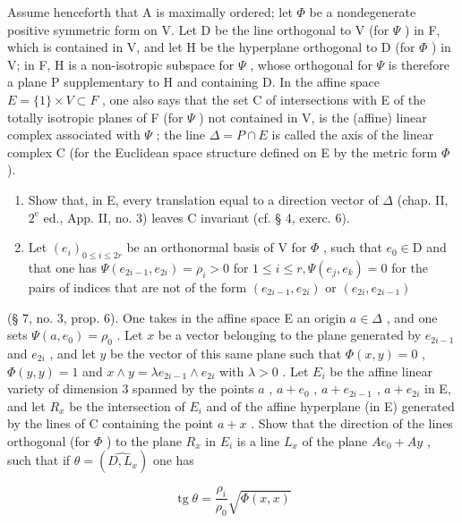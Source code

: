 Assume henceforth that A is maximally ordered; let \(\Phi\) be a nondegenerate positive symmetric form on V. Let D be the line orthogonal to V (for \(\Psi\) ) in F, which is contained in V, and let H be the hyperplane orthogonal to D (for \(\Phi\) ) in V; in F, H is a non-isotropic subspace for \(\Psi\) , whose orthogonal for \(\Psi\) is therefore a plane P supplementary to H and containing D. In the affine space \(E = \{1\} \times V \subset F\) , one also says that the set C of intersections with E of the totally isotropic planes of F (for \(\Psi\) ) not contained in V, is the (affine) linear complex associated with \(\Psi\) ; the line \(\Delta = P \cap E\) is called the axis of the linear complex C (for the Euclidean space structure defined on E by the metric form \(\Phi\) ).

\begin{enumerate}
\def\labelenumi{\alph{enumi})}
\item
  Show that, in E, every translation equal to a direction vector of \(\Delta\) (chap. II, \(2^{\text{e}}\) ed., App. II, no. 3) leaves C invariant (cf. § 4, exerc. 6).
\item
  Let \((e_i)_{0\leqslant i\leqslant 2r}\) be an orthonormal basis of V for \(\Phi\) , such that \(e_0\in \mathrm{D}\) and that one has \(\Psi (e_{2i - 1},e_{2i}) = \rho_{i} > 0\) for \(1\leqslant i\leqslant r,\Psi (e_j,e_k) = 0\) for the pairs of indices that are not of the form \((e_{2i - 1},e_{2i})\) or \((e_{2i},e_{2i - 1})\)
\end{enumerate}

(§ 7, no. 3, prop. 6). One takes in the affine space E an origin \(a \in \Delta\) , and one sets \(\Psi(a, e_0) = \rho_0\) . Let \(x\) be a vector belonging to the plane generated by \(e_{2i-1}\) and \(e_{2i}\) , and let \(y\) be the vector of this same plane such that \(\Phi(x, y) = 0\) , \(\Phi(y, y) = 1\) and \(x \wedge y = \lambda e_{2i-1} \wedge e_{2i}\) with \(\lambda > 0\) . Let \(E_i\) be the affine linear variety of dimension 3 spanned by the points \(a\) , \(a + e_0\) , \(a + e_{2i-1}\) , \(a + e_{2i}\) in E, and let \(R_x\) be the intersection of \(E_i\) and of the affine hyperplane (in E) generated by the lines of C containing the point \(a + x\) . Show that the direction of the lines orthogonal (for \(\Phi\) ) to the plane \(R_x\) in \(E_i\) is a line \(L_x\) of the plane \(Ae_0 + Ay\) , such that if \(\theta = (\widehat{D, L_x})\) one has

\[
\operatorname{tg} \theta = \frac {\rho_ {i}}{\rho_ {0}} \sqrt {\Phi (x , x)}
\]

